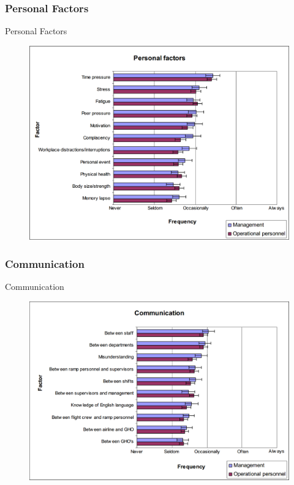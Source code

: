 \subsubsection{Personal Factors}
\begin{frame}{Personal Factors}{}
	\begin{figure}[H]
	\centering
	\includegraphics[width=\textwidth]{Grafik/PersonalFactors}
\end{figure}
\end{frame}

\subsubsection{Communication}
\begin{frame}{Communication}{}
	\begin{figure}[H]
	\centering
	\includegraphics[width=\textwidth]{Grafik/CommunicationalFactors}
\end{figure}
\end{frame}

